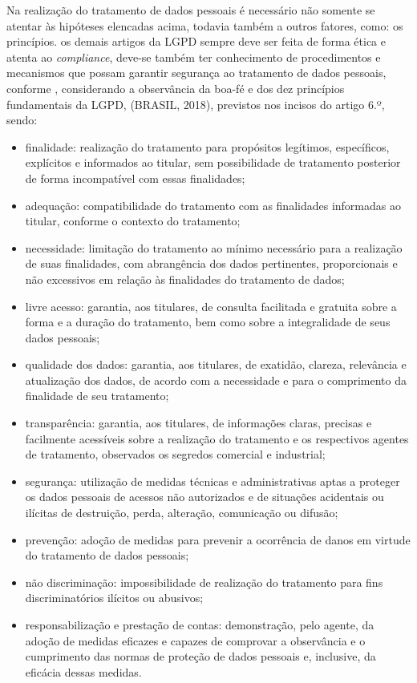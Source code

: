 \documentclass[
	12pt,				%
	openright,			%
	oneside,			%
	a4paper,			%
	english,			%
	french,				%
	spanish,			%
	brazil,				%
	]{abntex2}
\begin{document}
Na realização do tratamento de dados pessoais é necessário não somente se atentar às hipóteses elencadas acima, todavia também a outros fatores, como: os princípios. os demais artigos da LGPD sempre deve ser feita de forma ética e atenta ao \textit{compliance}, deve-se também ter conhecimento de procedimentos e mecanismos que possam garantir segurança ao tratamento de dados pessoais, conforme , considerando a observância da boa-fé e dos dez princípios fundamentais da LGPD, (BRASIL, 2018), previstos nos incisos do artigo 6.º, sendo:

\begin{itemize}
\item finalidade: realização do tratamento para propósitos legítimos, específicos, explícitos e informados ao titular, sem possibilidade de tratamento posterior de forma incompatível com essas finalidades;
\item adequação: compatibilidade do tratamento com as finalidades informadas ao titular, conforme o contexto do tratamento;
\item necessidade: limitação do tratamento ao mínimo necessário para a realização de suas finalidades, com abrangência dos dados pertinentes, proporcionais e não excessivos em relação às finalidades do tratamento de dados;
\item livre acesso: garantia, aos titulares, de consulta facilitada e gratuita sobre a forma e a duração do tratamento, bem como sobre a integralidade de seus dados pessoais;
\item qualidade dos dados: garantia, aos titulares, de exatidão, clareza, relevância e atualização dos dados, de acordo com a necessidade e para o comprimento da finalidade de seu tratamento;
\item transparência: garantia, aos titulares, de informações claras, precisas e facilmente acessíveis sobre a realização do tratamento e os respectivos agentes de tratamento, observados os segredos comercial e industrial;
\item segurança: utilização de medidas técnicas e administrativas aptas a proteger os dados pessoais de acessos não autorizados e de situações acidentais ou ilícitas de destruição, perda, alteração, comunicação ou difusão;
\item prevenção: adoção de medidas para prevenir a ocorrência de danos em virtude do tratamento de dados pessoais;
\item não discriminação: impossibilidade de realização do tratamento para fins discriminatórios ilícitos ou abusivos; 
\item responsabilização e prestação de contas: demonstração, pelo agente, da adoção de medidas eficazes e capazes de comprovar a observância e o cumprimento das normas de proteção de dados pessoais e, inclusive, da eficácia dessas medidas.
\end{itemize}
\end{document}
